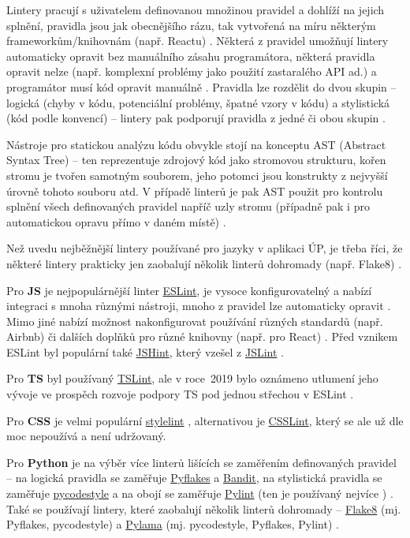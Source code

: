 Lintery pracují s uživatelem definovanou množinou pravidel a dohlíží na jejich splnění, pravidla jsou jak obecnějšího rázu, tak vytvořená na míru některým frameworkům/knihovnám (např. Reactu) \cite{linter-medium1}. Některá z pravidel umožňují lintery automaticky opravit bez manuálního zásahu programátora, některá pravidla opravit nelze (např. komplexní problémy jako použití zastaralého API ad.) a programátor musí kód opravit manuálně \cite{linter-medium1}. Pravidla lze rozdělit do dvou skupin -- logická (chyby v kódu, potenciální problémy, špatné vzory v kódu) a stylistická (kód podle konvencí) -- lintery pak podporují pravidla z jedné či obou skupin \cite{linter-realpython}.

Nástroje pro statickou analýzu kódu obvykle stojí na konceptu AST (Abstract Syntax Tree) -- ten reprezentuje zdrojový kód jako stromovou strukturu, kořen stromu je tvořen samotným souborem, jeho potomci jsou konstrukty z nejvyšší úrovně tohoto souboru atd. V případě linterů je pak AST použit pro kontrolu splnění všech definovaných pravidel napříč uzly stromu (případně pak i pro automatickou opravu přímo v daném místě) \cite{linter-medium1, linter-medium2}.

Než uvedu nejběžnější lintery používané pro jazyky v aplikaci ÚP, je třeba říci, že některé lintery prakticky jen zaobalují několik linterů dohromady (např. Flake8) \cite{linter-realpython}.

Pro \textbf{JS} je nejpopulárnější linter \href{https://eslint.org/}{ESLint}, je vysoce konfigurovatelný a nabízí integraci s mnoha různými nástroji, mnoho z pravidel lze automaticky opravit \cite{linter-medium1}. Mimo jiné nabízí možnost nakonfigurovat používání různých standardů (např. Airbnb) \cite{linter-restishistory} či dalších doplňků pro různé knihovny (např. pro React) \cite{react-eslint}. Před vznikem ESLint byl populární také \href{https://jshint.com/}{JSHint}, který vzešel z \href{https://jslint.com/}{JSLint} \cite{linter-restishistory}.

Pro \textbf{TS} byl používaný \href{https://palantir.github.io/tslint/}{TSLint}, ale v roce~2019 bylo oznámeno utlumení jeho vývoje ve prospěch rozvoje podpory TS pod jednou střechou v ESLint \cite{linter-eslintts}.

Pro \textbf{CSS} je velmi populární \href{https://stylelint.io/}{stylelint} \cite{stylelint, linter-css}, alternativou je \href{http://csslint.net/}{CSSLint}, který se ale už dle \cite{linter-css} moc nepoužívá a není udržovaný.

Pro \textbf{Python} je na výběr více linterů lišících se zaměřením definovaných pravidel -- na logická pravidla se zaměřuje \href{https://github.com/PyCQA/pyflakes}{Pyflakes} a \href{https://github.com/PyCQA/bandit}{Bandit}, na stylistická pravidla se zaměřuje \href{https://github.com/PyCQA/pycodestyle}{pycodestyle} a na obojí se zaměřuje \href{https://www.pylint.org/}{Pylint} (ten je používaný nejvíce \cite{linter-python}) \cite{linter-realpython}. Také se používají lintery, které zaobalují několik linterů dohromady -- \href{https://flake8.pycqa.org/en/latest/}{Flake8} (mj. Pyflakes, pycodestyle) a \href{https://github.com/klen/pylama}{Pylama} (mj. pycodestyle, Pyflakes, Pylint) \cite{linter-realpython}.


